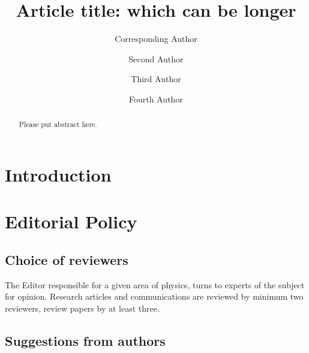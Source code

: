 \documentclass[USenglish,oneside,twocolumn]{article}
\begin{document}
\author*[1]{Corresponding Author}

\author[2]{Second Author}

\author[3]{Third Author}

\author[4]{Fourth Author}





\title{\huge Article title: which can be longer}



\begin{abstract}
    {Please put abstract here.}
\end{abstract}




\maketitle
\section{Introduction}


\section{Editorial Policy}

\subsection{Choice of reviewers}

The Editor responsible for a given area of physics, turns to experts of the subject for opinion. Research articles and communications are reviewed by minimum two reviewers, review papers by at least three.

\subsection{Suggestions from authors}
\end{document}
